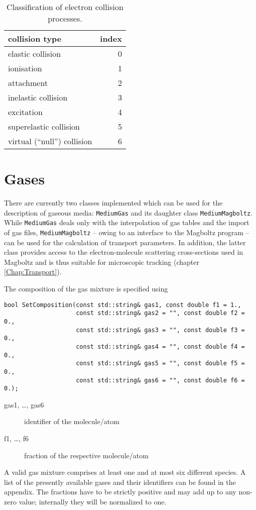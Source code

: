 \begin{table}
  \centering
  \begin{tabular}{l r}
    \toprule
    collision type         & index \\
    \midrule
    elastic collision      & 0  \\
    ionisation             & 1  \\
    attachment             & 2  \\
    inelastic collision    & 3  \\
    excitation             & 4  \\
    superelastic collision & 5  \\
    virtual (``null'') collision & 6 \\
    \bottomrule
  \end{tabular}
  \caption{Classification of electron collision processes.}
  \label{Tab:ElectronCollisionType}
\end{table}
\section{Gases}

There are currently two classes implemented which can be used for the 
description of gaseous media: \texttt{MediumGas} and its 
daughter class \texttt{MediumMagboltz}. 
While \texttt{MediumGas} deals only with the interpolation of gas tables 
and the import of gas files, 
\texttt{MediumMagboltz} -- owing to an interface to the 
Magboltz program \cite{Biagi1999} -- can be used for the calculation 
of transport parameters. 
In addition, the latter class provides access to the 
electron-molecule scattering cross-sections used in Magboltz and is 
thus suitable for microscopic tracking (chapter \ref{Chap:Transport}). 

The composition of the gas mixture is specified using
\begin{lstlisting}
bool SetComposition(const std::string& gas1, const double f1 = 1.,
                    const std::string& gas2 = "", const double f2 = 0.,
                    const std::string& gas3 = "", const double f3 = 0.,
                    const std::string& gas4 = "", const double f4 = 0.,
                    const std::string& gas5 = "", const double f5 = 0.,
                    const std::string& gas6 = "", const double f6 = 0.);
\end{lstlisting}
\begin{description}
  \item[gas1, \dots, gas6] identifier of the molecule/atom
  \item[f1, \dots, f6] fraction of the respective molecule/atom   
\end{description}
A valid gas mixture comprises at least one and at most six 
different species. 
A list of the presently available gases and their identifiers 
can be found in the appendix. 
The fractions have to be strictly positive and 
may add up to any non-zero value; 
internally they will be normalized to one.


